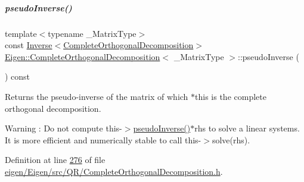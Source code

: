 \mbox{\label{group___q_r___module_a3c89639299720ce089435d26d6822d6f}} 
\subparagraph{\texorpdfstring{pseudo\+Inverse()}{pseudoInverse()}\hspace{0.1cm}{\footnotesize\ttfamily [1/2]}}
{\footnotesize\ttfamily template$<$typename \+\_\+\+Matrix\+Type$>$ \\
const \hyperlink{class_eigen_1_1_inverse}{Inverse}$<$\hyperlink{group___q_r___module_class_eigen_1_1_complete_orthogonal_decomposition}{Complete\+Orthogonal\+Decomposition}$>$ \hyperlink{group___q_r___module_class_eigen_1_1_complete_orthogonal_decomposition}{Eigen\+::\+Complete\+Orthogonal\+Decomposition}$<$ \+\_\+\+Matrix\+Type $>$\+::pseudo\+Inverse (\begin{DoxyParamCaption}{ }\end{DoxyParamCaption}) const\hspace{0.3cm}{\ttfamily [inline]}}

\begin{DoxyReturn}{Returns}
the pseudo-\/inverse of the matrix of which $\ast$this is the complete orthogonal decomposition. 
\end{DoxyReturn}
\begin{DoxyWarning}{Warning}
\+: Do not compute {\ttfamily this-\/$>$\hyperlink{group___q_r___module_a3c89639299720ce089435d26d6822d6f}{pseudo\+Inverse()}$\ast$rhs} to solve a linear systems. It is more efficient and numerically stable to call {\ttfamily this-\/$>$solve(rhs)}. 
\end{DoxyWarning}


Definition at line \hyperlink{eigen_2_eigen_2src_2_q_r_2_complete_orthogonal_decomposition_8h_source_l00276}{276} of file \hyperlink{eigen_2_eigen_2src_2_q_r_2_complete_orthogonal_decomposition_8h_source}{eigen/\+Eigen/src/\+Q\+R/\+Complete\+Orthogonal\+Decomposition.\+h}.

